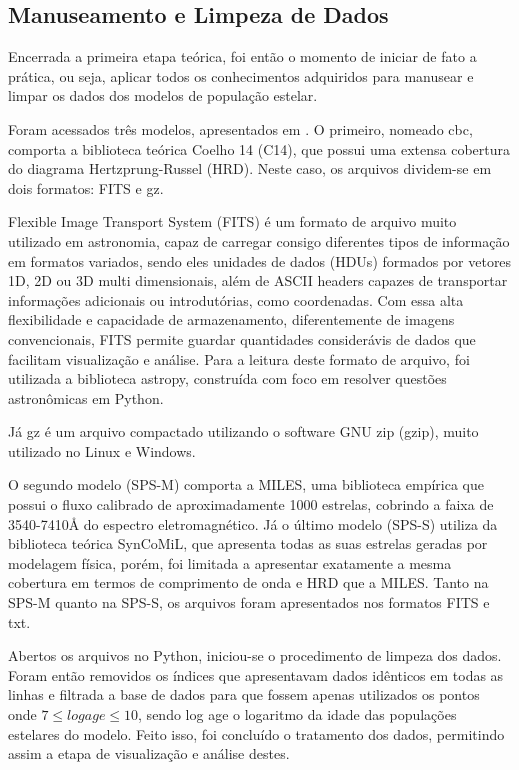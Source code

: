 \documentclass[12pt]{projeto}
\begin{document}
\subsection{Manuseamento e Limpeza de Dados}

Encerrada a primeira etapa teórica, foi então o momento de iniciar de fato a prática, ou seja, aplicar todos os conhecimentos adquiridos para manusear e limpar os dados dos modelos de população estelar.

Foram acessados três modelos, apresentados em \cite{Paula2020}. O primeiro, nomeado cbc, comporta a biblioteca teórica Coelho 14 (C14), que possui uma extensa cobertura do diagrama Hertzprung-Russel (HRD). Neste caso, os arquivos dividem-se em dois formatos: FITS e gz. 

Flexible Image Transport System (FITS) é um formato de arquivo muito utilizado em astronomia, capaz de carregar consigo diferentes tipos de informação em formatos variados, sendo eles unidades de dados (HDUs) formados por vetores 1D, 2D ou 3D multi dimensionais, além de ASCII headers capazes de transportar informações adicionais ou introdutórias, como coordenadas. Com essa alta flexibilidade e capacidade de armazenamento, diferentemente de imagens convencionais, FITS permite guardar quantidades considerávis de dados que facilitam visualização e análise. Para a leitura deste formato de arquivo, foi utilizada a biblioteca astropy, construída com foco em resolver questões astronômicas em Python.

Já gz é um arquivo compactado utilizando o software GNU zip (gzip), muito utilizado no Linux e Windows.

O segundo modelo (SPS-M) comporta a MILES, uma biblioteca empírica que possui o fluxo calibrado de aproximadamente
1000 estrelas, cobrindo a faixa de 3540-7410Å do espectro eletromagnético. Já o último modelo (SPS-S) utiliza da biblioteca teórica SynCoMiL, que apresenta todas as suas estrelas geradas por modelagem física, porém, foi limitada a apresentar exatamente a mesma cobertura em termos de comprimento de onda e HRD que a MILES. Tanto na SPS-M quanto na SPS-S, os arquivos foram apresentados nos formatos FITS e txt.


Abertos os arquivos no Python, iniciou-se o procedimento de limpeza dos dados. Foram então removidos os índices que apresentavam dados idênticos em todas as linhas e filtrada a base de dados para que fossem apenas utilizados os pontos onde \(7 \leq log age \leq 10\), sendo log age o logaritmo da idade das populações estelares do modelo. Feito isso, foi concluído o tratamento dos dados, permitindo assim a etapa de visualização e análise destes. 
\end{document}
